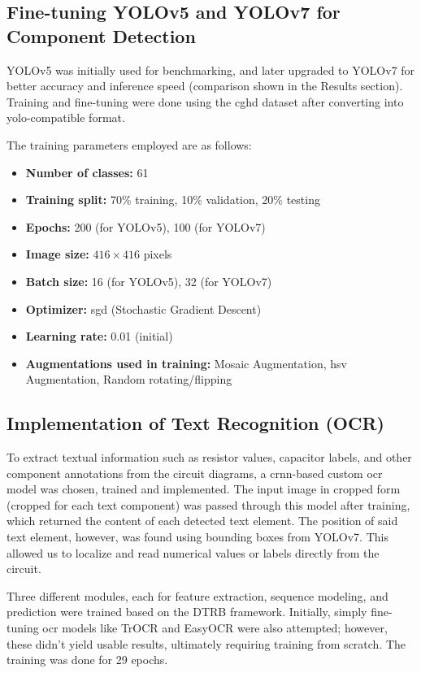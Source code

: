 \subsection{Fine-tuning YOLOv5 and YOLOv7 for Component Detection}

YOLOv5 was initially used for benchmarking, and later upgraded to YOLOv7 for better accuracy and inference speed (comparison shown in the Results section). Training and fine-tuning were done using the \gls{cghd} dataset after converting into \gls{yolo}-compatible format.

The training parameters employed are as follows:

\begin{itemize}
    \item \textbf{Number of classes:} 61
    \item \textbf{Training split:} 70\% training, 10\% validation, 20\% testing
    \item \textbf{Epochs:} 200 (for YOLOv5), 100 (for YOLOv7)
    \item \textbf{Image size:} $416 \times 416$ pixels
    \item \textbf{Batch size:} 16 (for YOLOv5), 32 (for YOLOv7)
    \item \textbf{Optimizer:} \gls{sgd} (Stochastic Gradient Descent)
    \item \textbf{Learning rate:} 0.01 (initial)
    \item \textbf{Augmentations used in training:} Mosaic Augmentation, \gls{hsv} Augmentation, Random rotating/flipping
\end{itemize}

\subsection{Implementation of Text Recognition (OCR)}

To extract textual information such as resistor values, capacitor labels, and other component annotations from the circuit diagrams, a \gls{crnn}-based custom \gls{ocr} model was chosen, trained and implemented. The input image in cropped form (cropped for each text component) was passed through this model after training, which returned the content of each detected text element. The position of said text element, however, was found using bounding boxes from YOLOv7. This allowed us to localize and read numerical values or labels directly from the circuit.

Three different modules, each for feature extraction, sequence modeling, and prediction were trained based on the DTRB framework. Initially, simply fine-tuning \gls{ocr} models like TrOCR and EasyOCR were also attempted; however, these didn't yield usable results, ultimately requiring training from scratch. The training was done for 29 epochs.

